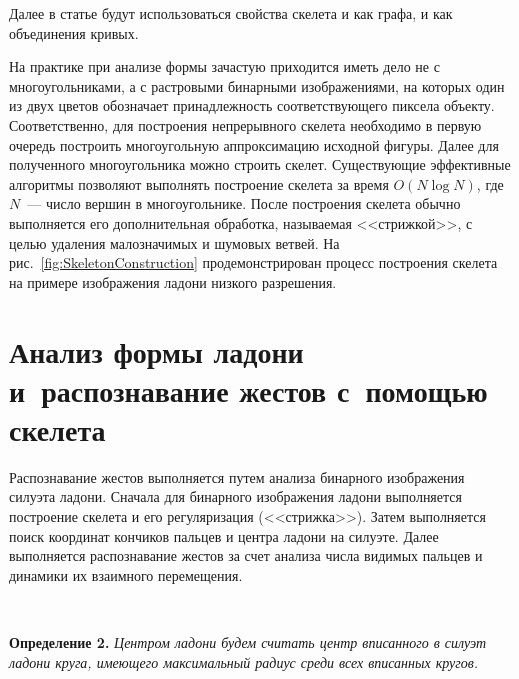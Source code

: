 \begin{multicols}{2}
Далее в статье будут использоваться свойства скелета и как графа, и как объединения кривых.

На практике при анализе формы зачастую приходится 
иметь дело не с многоугольниками, а с растровыми бинарными изображениями, на 
которых один из двух цветов обозначает принадлежность соответствующего пиксела объекту.
Соответственно, для построения непрерывного скелета необходимо в первую очередь построить 
многоугольную аппроксимацию исходной фигуры.
Далее для полученного многоугольника можно строить скелет.
Существующие эффективные алгоритмы позволяют выполнять построение скелета за время 
$O(N \log N)$,
где $N$~--- чис\-ло вершин в многоугольнике.
После построения скелета обычно выполняется его дополнительная обработка, 
называемая <<стрижкой>>, с целью удаления малозначимых и шумовых ветвей.
На рис.~\ref{fig:SkeletonConstruction} продемонстрирован процесс построения 
скелета на примере изображения ладони низкого разрешения.

\vspace*{-6pt}

\section{Анализ формы ладони и~распознавание жестов с~помощью скелета}\label{seq:PalmShapeAnalysis}

Распознавание жестов выполняется путем анализа бинарного изображения силуэта ладони.
Сначала для бинарного изображения ладони выполняется построение скелета и его 
регуляризация (<<стрижка>>).
Затем выполняется поиск координат кончиков пальцев и центра ладони на силуэте.
Далее выполняется распознавание жестов за счет анализа числа видимых пальцев и 
динамики их взаимного перемещения.

\begin{figure*} %
\vspace*{1pt}
 \begin{center}
 \mbox{%
 \epsfxsize=145.854mm
 }
 \end{center}
 \vspace*{-9pt}
\end{figure*}


\smallskip

\noindent
\textbf{Определение 2.} %
\textit{Центром ладони будем считать центр вписанного в силуэт ладони круга, имеющего максимальный радиус среди всех вписанных кругов.
}


\end{multicols}
